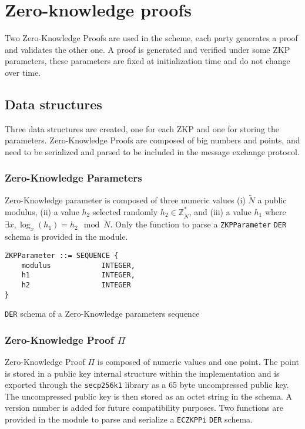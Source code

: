 
\section{Zero-knowledge proofs}

Two Zero-Knowledge Proofs are used in the scheme, each party generates a proof
and validates the other one. A proof is generated and verified under some ZKP
parameters, these parameters are fixed at initialization time and do not
change over time.

\subsection{Data structures}

Three data structures are created, one for each ZKP and one for storing the
parameters. Zero-Knowledge Proofs are composed of big numbers and points, and
need to be serialized and parsed to be included in the message exchange
protocol.

\subsubsection{Zero-Knowledge Parameters}

Zero-Knowledge parameter is composed of three numeric values (i) $\tilde{N}$ a
public modulus, (ii) a value $h_2$ selected randomly $h_2 \in
\mathbb{Z}_{\tilde{N}}^*$, and (iii) a value $h_1$ where $\exists x, \log_x(h_1) =
h_2 \mod \tilde{N}$. Only the function to parse a \texttt{ZKPParameter}
\texttt{DER} schema is provided in the module.

\begin{listing}
  \begin{verbatim}
ZKPParameter ::= SEQUENCE {
    modulus            INTEGER,
    h1                 INTEGER,
    h2                 INTEGER
}
  \end{verbatim}
	\caption{\texttt{DER} schema of a Zero-Knowledge parameters sequence}
	\label{lst:DERSchemaZKPParams}
\end{listing}

\subsubsection{Zero-Knowledge Proof $\Pi$}

Zero-Knowledge Proof $\Pi$ is composed of numeric values and one point. The
point is stored in a public key internal structure within the implementation and
is exported through the \texttt{secp256k1} library as a 65 byte uncompressed public key.
The uncompressed public key is then stored as an octet string in the schema. A
version number is added for future compatibility purposes. Two functions are
provided in the module to parse and serialize a \texttt{ECZKPPi} \texttt{DER}
schema.

